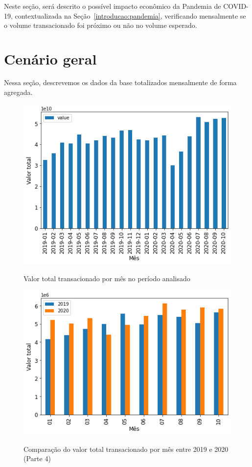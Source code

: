 
Neste seção, será descrito o possível impacto econômico da Pandemia de COVID-19, contextualizada na Seção~\ref{introducao:pandemia}, verificando mensalmente se o volume transacionado foi próximo ou não no volume esperado.

\section{Cenário geral}
\label{section:impacto:cenario-geral}

Nessa seção, descrevemos os dados da base totalizados mensalmente de forma agregada.

\begin{figure}[htb]
	\centering
    \caption{Valor total transacionado por mês no período analisado}
    \includegraphics[scale=0.7]{images/base-de-dados-18.1-valor-mensal-total.png}
    \label{fig:pandemia:base-de-dados-18.1-valor-mensal-total}
    \fdadospesquisa
\end{figure}

\begin{figure}[htb]
	\centering
    \caption{Comparação do valor total transacionado por mês entre 2019 e 2020 (Parte 4)}
    \includegraphics[scale=0.7]{images/base-de-dados-19.1-comparacao-valor-mensal-total.png}
    \label{fig:pandemia:base-de-dados-19.1-comparacao-valor-mensal-total}
    \fdadospesquisa
\end{figure}

